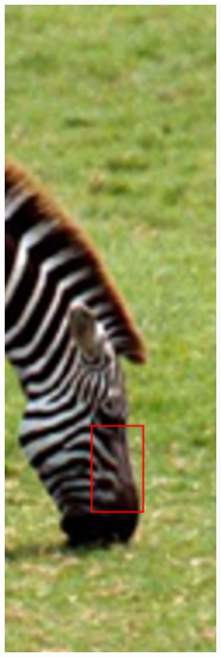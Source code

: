 \documentclass[review,numbers,sort&compress]{elsarticle}  %
\begin{document}
\begin{figure}[t]
{\begin{minipage}[b]{0.12\textwidth}
                \includegraphics[width=1\textwidth]{compareImage/zebra_crop_Bicu.png} \\

\end{minipage}}
\end{figure}
\end{document}
